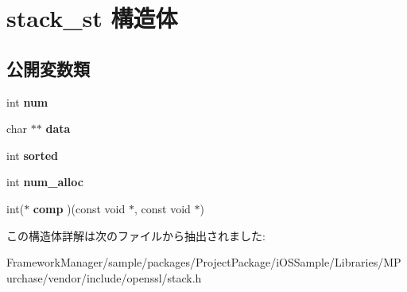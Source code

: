 \hypertarget{structstack__st}{}\section{stack\+\_\+st 構造体}
\label{structstack__st}
\subsection*{公開変数類}
\begin{DoxyCompactItemize}
\item 
\hypertarget{structstack__st_af60cc588694f5798623d33fe70946748}{}int {\bfseries num}\label{structstack__st_af60cc588694f5798623d33fe70946748}

\item 
\hypertarget{structstack__st_af7d6fc34731b1971666de50613a0fb53}{}char $\ast$$\ast$ {\bfseries data}\label{structstack__st_af7d6fc34731b1971666de50613a0fb53}

\item 
\hypertarget{structstack__st_a8bc2f5dfd119fa8339637dfbca8251d9}{}int {\bfseries sorted}\label{structstack__st_a8bc2f5dfd119fa8339637dfbca8251d9}

\item 
\hypertarget{structstack__st_a4ad771fe5551133410de60b2e8b2028d}{}int {\bfseries num\+\_\+alloc}\label{structstack__st_a4ad771fe5551133410de60b2e8b2028d}

\item 
\hypertarget{structstack__st_a91ae59f4cee454d2eef6dc1635e9cf46}{}int($\ast$ {\bfseries comp} )(const void $\ast$, const void $\ast$)\label{structstack__st_a91ae59f4cee454d2eef6dc1635e9cf46}

\end{DoxyCompactItemize}


この構造体詳解は次のファイルから抽出されました\+:\begin{DoxyCompactItemize}
\item 
Framework\+Manager/sample/packages/\+Project\+Package/i\+O\+S\+Sample/\+Libraries/\+M\+Purchase/vendor/include/openssl/stack.\+h\end{DoxyCompactItemize}
